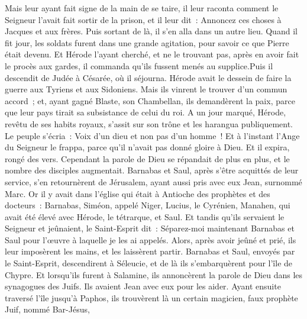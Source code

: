 \begin{multicols}{2}
Mais leur ayant fait signe de la main de se taire, il leur raconta comment le Seigneur l'avait fait sortir de la prison, et il leur dit~: Annoncez ces choses à Jacques et aux frères. Puis sortant de là, il s'en alla dans un autre lieu.
Quand il fit jour, les soldats furent dans une grande agitation, pour savoir ce que Pierre était devenu.
Et Hérode l'ayant cherché, et ne le trouvant pas, après en avoir fait le procès aux gardes, il commanda qu'ils fussent menés au supplice.Puis il descendit de Judée à Césarée, où il séjourna. 
Hérode avait le dessein de faire la guerre aux Tyriens et aux Sidoniens. Mais ils vinrent le trouver d'un commun accord~; et, ayant gagné Blaste, son Chambellan, ils demandèrent la paix, parce que leur pays tirait sa subsistance de celui du roi.
A un jour marqué, Hérode, revêtu de ses habits royaux, s'assit sur son trône et les harangua publiquement.
Le peuple s'écria~: Voix d'un dieu et non pas d'un homme~!
Et à l'instant l'Ange du Seigneur le frappa, parce qu'il n'avait pas donné gloire à Dieu. Et il expira, rongé des vers.
Cependant la parole de Dieu se répandait de plus en plus, et le nombre des disciples augmentait.
Barnabas et Saul, après s'être acquittés de leur service, s'en retournèrent de Jérusalem, ayant aussi pris avec eux Jean, surnommé Marc.
\VerseOne{}Or il y avait dans l'église qui était à Antioche des prophètes et des docteurs~: Barnabas, Siméon, appelé Niger, Lucius, le Cyrénien, Manahen, qui avait été élevé avec Hérode, le tétrarque, et Saul.
Et tandis qu'ils servaient le Seigneur et jeûnaient, le Saint-Esprit dit~: Séparez-moi maintenant Barnabas et Saul pour l'œuvre à laquelle je les ai appelés.
Alors, après avoir jeûné et prié, ils leur imposèrent les mains, et les laissèrent partir.
Barnabas et Saul, envoyés par le Saint-Esprit, descendirent à Séleucie, et de là ils s'embarquèrent pour l'île de Chypre.
Et lorsqu'ils furent à Salamine, ils annoncèrent la parole de Dieu dans les synagogues des Juifs. Ils avaient Jean avec eux pour les aider.
Ayant ensuite traversé l'île jusqu'à Paphos, ils trouvèrent là un certain magicien, faux prophète Juif, nommé Bar-Jésus,

\end{multicols}
